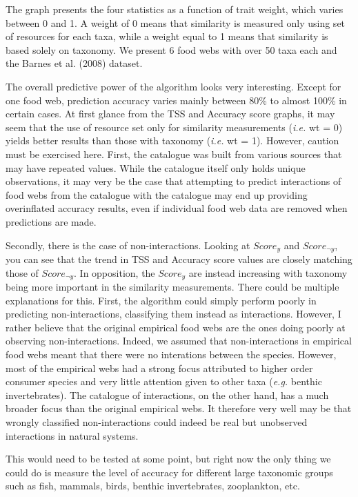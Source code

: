 \documentclass[letterpaper]{article}
\begin{document}
The graph presents the four statistics as a function of trait weight, which varies between 0 and 1. A weight of 0 means that similarity is measured only using set of resources for each taxa, while a weight equal to 1 means that similarity is based solely on taxonomy. We present 6 food webs with over 50 taxa each and the Barnes et al. (2008) dataset.

The overall predictive power of the algorithm looks very interesting. Except for one food web, prediction accuracy varies mainly between 80\% to almost 100\% in certain cases. At first glance from the TSS and Accuracy score graphs, it may seem that the use of resource set only for similarity measurements (\textit{i.e.} wt = 0) yields better results than those with taxonomy (\textit{i.e.} wt = 1). However, caution must be exercised here. First, the catalogue was built from various sources that may have repeated values. While the catalogue itself only holds unique observations, it may very be the case that attempting to predict interactions of food webs from the catalogue with the catalogue may end up providing overinflated accuracy results, even if individual food web data are removed when predictions are made.

Secondly, there is the case of non-interactions. Looking at $Score_y$ and $Score_{\neg y}$, you can see that the trend in TSS and Accuracy score values are closely matching those of $Score_{\neg y}$. In opposition, the $Score_y$ are instead increasing with taxonomy being more important in the similarity measurements. There could be multiple explanations for this. First, the algorithm could simply perform poorly in predicting non-interactions, classifying them instead as interactions. However, I rather believe that the original empirical food webs are the ones doing poorly at observing non-interactions. Indeed, we assumed that non-interactions in empirical food webs meant that there were no interations between the species. However, most of the empirical webs had a strong focus attributed to higher order consumer species and very little attention given to other taxa (\textit{e.g.} benthic invertebrates). The catalogue of interactions, on the other hand, has a much broader focus than the original empirical webs. It therefore very well may be that wrongly classified non-interactions could indeed be real but unobserved interactions in natural systems.

This would need to be tested at some point, but right now the only thing we could do is measure the level of accuracy for different large taxonomic groups such as fish, mammals, birds, benthic invertebrates, zooplankton, etc.
\end{document}

